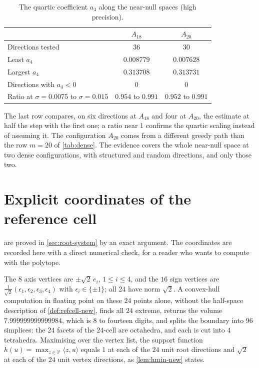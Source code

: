 \documentclass[11pt,reqno]{amsart}
\renewcommand{\_}{\origunderscore\allowbreak}
\numberwithin{equation}{section}
\theoremstyle{plain}
\theoremstyle{definition}
\theoremstyle{remark}
\newcommand{\VCell}{\mathcal{V}}             %
\begin{document}
\begin{table}[ht]
\centering
\caption{The quartic coefficient $a_4$ along the near-null spaces (high precision).}\label{tab:sampling}
\renewcommand{\arraystretch}{1.2}
\begin{tabular}{lcc}
\toprule
 & $A_{18}$ & $A_{20}$\\
\midrule
Directions tested & $36$ & $30$\\
Least $a_4$ & $0.008779$ & $0.007628$\\
Largest $a_4$ & $0.313708$ & $0.313731$\\
Directions with $a_4<0$ & $0$ & $0$\\
Ratio at $\sigma=0.0075$ to $\sigma=0.015$ & $0.954$ to $0.991$ & $0.952$ to $0.991$\\
\bottomrule
\end{tabular}
\end{table}

The last row compares, on six directions at $A_{18}$ and four at $A_{20}$,
the estimate at half the step with the first one; a ratio near $1$
confirms the quartic scaling instead of assuming it. The configuration
$A_{20}$ comes from a different greedy path than the row $m=20$ of
\cref{tab:dense}. The evidence covers the whole near-null space at two
dense configurations, with structured and random directions, and only
those two.

\section{Explicit coordinates of the reference cell}\label{app:explicit-vertices}

 are proved in
\cref{sec:root-system} by an exact argument. The coordinates are recorded
here with a direct numerical check, for a reader who wants to compute with
the polytope.

The $8$ axis vertices are $\pm\sqrt2\,e_i$, $1\le i\le4$, and the $16$
sign vertices are $\frac1{\sqrt2}(\epsilon_1,\epsilon_2,\epsilon_3,\epsilon_4)$
with $\epsilon_i\in\{\pm1\}$; all $24$ have norm $\sqrt2$. A convex-hull
computation in floating point on these $24$ points alone, without the
half-space description of \cref{def:refcell-new}, finds all $24$ extreme,
returns the volume $7.999999999999984$, which is $8$ to fourteen digits,
and splits the boundary into $96$ simplices: the $24$ facets of the
$24$-cell are octahedra, and each is cut into $4$ tetrahedra. Maximising
over the vertex list, the support function $h(u)=\max_{z\in\VCell}\langle
z,u\rangle$ equals $1$ at each of the $24$ unit root directions and
$\sqrt2$ at each of the $24$ unit vertex directions, as
\cref{lem:hmin-new} states.
\end{document}
